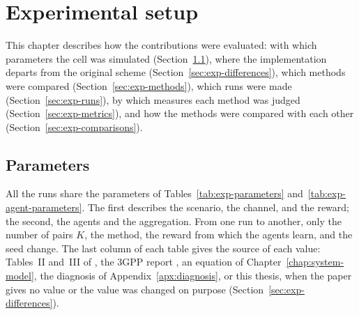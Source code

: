 \chapter{Experimental setup}
\label{chap:experimental-setup}

This chapter describes how the contributions were evaluated: with which parameters the cell was simulated
(Section~\ref{sec:exp-parameters}), where the implementation departs from the original scheme
(Section~\ref{sec:exp-differences}), which methods were compared (Section~\ref{sec:exp-methods}), which runs
were made (Section~\ref{sec:exp-runs}), by which measures each method was judged
(Section~\ref{sec:exp-metrics}), and how the methods were compared with each other
(Section~\ref{sec:exp-comparisons}).

\section{Parameters}
\label{sec:exp-parameters}

All the runs share the parameters of Tables~\ref{tab:exp-parameters} and~\ref{tab:exp-agent-parameters}. The
first describes the scenario, the channel, and the reward; the second, the agents and the aggregation. From
one run to another, only the number of pairs $K$, the method, the reward from which the agents learn, and the
seed change. The last column of each table gives the source of each value: Tables~II and~III of
\citet{li+22fedmarl}, the \ac{3GPP} report \cite{3gpp16v2x}, an equation of
Chapter~\ref{chap:system-model}, the diagnosis of Appendix~\ref{apx:diagnosis}, or this thesis, when the
paper gives no value or the value was changed on purpose (Section~\ref{sec:exp-differences}).


